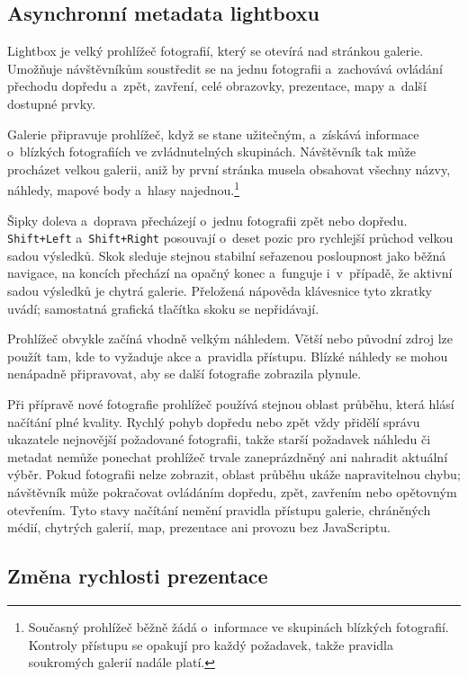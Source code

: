 \documentclass[11pt,a4paper]{article}
\newcommand{\codeword}[1]{\nolinkurl{#1}}
\begin{document}
\subsection{Asynchronní metadata lightboxu}

Lightbox je velký prohlížeč fotografií, který se otevírá nad stránkou galerie.
Umožňuje návštěvníkům soustředit se na jednu fotografii a~zachovává ovládání
přechodu dopředu a~zpět, zavření, celé obrazovky, prezentace, mapy a~další
dostupné prvky.

Galerie připravuje prohlížeč, když se stane užitečným, a~získává informace
o~blízkých fotografiích ve zvládnutelných skupinách. Návštěvník tak může
procházet velkou galerii, aniž by první stránka musela obsahovat všechny názvy,
náhledy, mapové body a~hlasy najednou.\footnote{Současný prohlížeč běžně žádá
o~informace ve skupinách blízkých fotografií. Kontroly přístupu se opakují pro
každý požadavek, takže pravidla soukromých galerií nadále platí.}

Šipky doleva a~doprava přecházejí o~jednu fotografii zpět nebo dopředu.
\codeword{Shift+Left} a~\codeword{Shift+Right} posouvají o~deset pozic pro
rychlejší průchod velkou sadou výsledků. Skok sleduje stejnou stabilní seřazenou
posloupnost jako běžná navigace, na koncích přechází na opačný konec a~funguje
i~v~případě, že aktivní sadou výsledků je chytrá galerie. Přeložená nápověda
klávesnice tyto zkratky uvádí; samostatná grafická tlačítka skoku se
nepřidávají.

Prohlížeč obvykle začíná vhodně velkým náhledem. Větší nebo původní zdroj lze
použít tam, kde to vyžaduje akce a~pravidla přístupu. Blízké náhledy se mohou
nenápadně připravovat, aby se další fotografie zobrazila plynule.

Při přípravě nové fotografie prohlížeč používá stejnou oblast průběhu, která
hlásí načítání plné kvality. Rychlý pohyb dopředu nebo zpět vždy přidělí správu
ukazatele nejnovější požadované fotografii, takže starší požadavek náhledu či
metadat nemůže ponechat prohlížeč trvale zaneprázdněný ani nahradit aktuální
výběr. Pokud fotografii nelze zobrazit, oblast průběhu ukáže napravitelnou
chybu; návštěvník může pokračovat ovládáním dopředu, zpět, zavřením nebo
opětovným otevřením. Tyto stavy načítání nemění pravidla přístupu galerie,
chráněných médií, chytrých galerií, map, prezentace ani provozu bez JavaScriptu.

\subsection{Změna rychlosti prezentace}
\end{document}
